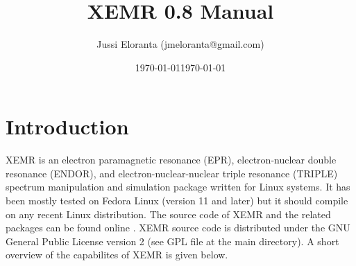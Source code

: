 \documentclass[byrevtex,amssymb,aps,pra,floatfix,letterpaper]{revtex4}
\date{\today}
\begin{document}
\title{XEMR 0.8 Manual}

\author{Jussi Eloranta (jmeloranta@gmail.com)}

\date{\today}

\maketitle

\section{Introduction}

XEMR is an electron paramagnetic resonance (EPR), electron-nuclear double resonance (ENDOR), and electron-nuclear-nuclear triple resonance (TRIPLE)
spectrum manipulation and simulation package written for Linux systems. It has been mostly tested on Fedora Linux (version 11 and later) but it should compile on any recent Linux distribution. The source code of XEMR and the related packages can be found online \cite{xemr}. XEMR source code is distributed under the GNU General Public License version 2 (see GPL file at the main directory). A short overview of the capabilites of XEMR is given below.
\end{document}
